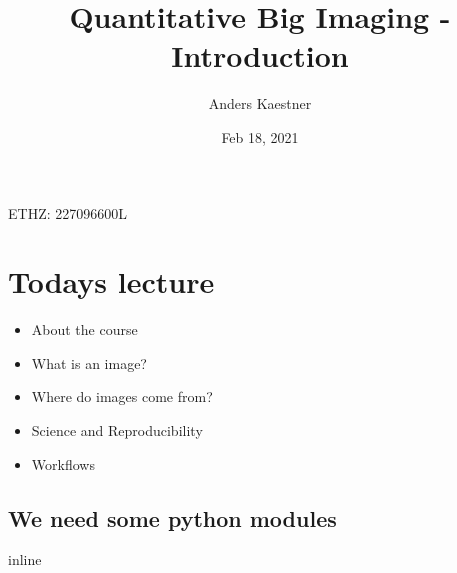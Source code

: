 \documentclass[letterpaper,10pt,english]{sphinxmanual}
\title{Quantitative Big Imaging - Introduction}
\date{Feb 18, 2021}
\author{Anders Kaestner}
\begin{document}
\pagestyle{empty}
\sphinxmaketitle
\pagestyle{plain}
\sphinxtableofcontents
\pagestyle{normal}
\label{\detokenize{01-Introduction::doc}}


\sphinxAtStartPar
{} ETHZ: 227\sphinxhyphen{}0966\sphinxhyphen{}00L




\chapter{Todays lecture}
\label{\detokenize{01-Introduction:todays-lecture}}\begin{itemize}
\item {} 
\sphinxAtStartPar
About the course

\item {} 
\sphinxAtStartPar
What is an image?

\item {} 
\sphinxAtStartPar
Where do images come from?

\item {} 
\sphinxAtStartPar
Science and Reproducibility

\item {} 
\sphinxAtStartPar
Workflows

\end{itemize}


\section{We need some python modules}
\label{\detokenize{01-Introduction:we-need-some-python-modules}}
\begin{sphinxVerbatim}[commandchars=\\\{\}]
 inline
   
   
   
   
   
   
 
\end{sphinxVerbatim}
\end{document}

